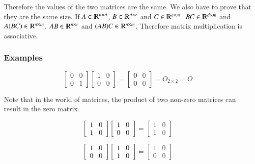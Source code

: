 \documentclass [12 pt, twoside] {book}
\newcommand\+{\text{ }}
\begin{document}
Therefore the values of the two matrices are the same. We also have to prove
that they are the same size. If $A \in \varmathbb{R}^{n \times d}$, $B \in
\varmathbb{R}^{d \times e}$ and $C \in \varmathbb{R}^{e \times m}$. $BC \in
\varmathbb{R}^{d \times m}$ and $A(BC) \in \varmathbb{R}^{n \times m}$. $AB \in
\varmathbb{R}^{n \times e}$ and $(AB)C \in \varmathbb{R}^{n \times m}$.
Therefore matrix multiplication is associative.

\subsubsection{Examples}

\[
    \left[\begin{array}{cc}
        0 & 0 \\
        0 & 1
    \end{array}\right]
    \left[\begin{array}{cc}
        1 & 0 \\
        0 & 0
    \end{array}\right]
    =
    \left[\begin{array}{cc}
        0 & 0 \\
        0 & 0
    \end{array}\right]
    = O_{2 \times 2}
    = O
\]

Note that in the world of matrices, the product of two non-zero matrices can
result in the zero matrix.

\[
    \left[\begin{array}{cc}
        1 & 0 \\
        1 & 0
    \end{array}\right]
    \left[\begin{array}{cc}
        1 & 0 \\
        0 & 0
    \end{array}\right]
    =
    \left[\begin{array}{cc}
        1 & 0 \\
        1 & 0
    \end{array}\right]
\]

\[
    \left[\begin{array}{cc}
        1 & 0 \\
        0 & 0
    \end{array}\right]
    \left[\begin{array}{cc}
        1 & 0 \\
        1 & 0
    \end{array}\right]
    =
    \left[\begin{array}{cc}
        1 & 0 \\
        0 & 0
    \end{array}\right]
\]
\end{document}
